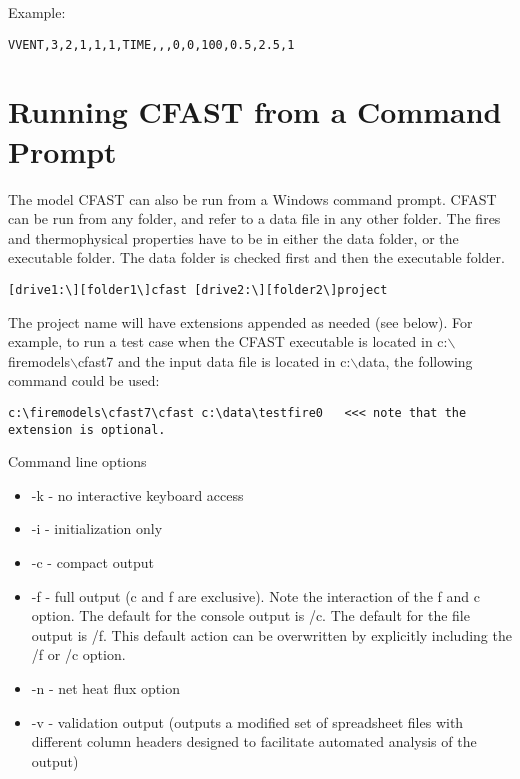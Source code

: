 \noindent Example:

\begin{lstlisting}
VVENT,3,2,1,1,1,TIME,,,0,0,100,0.5,2.5,1
\end{lstlisting}



\chapter{Running CFAST from a Command Prompt}

The model CFAST can also be run from a Windows command prompt.  CFAST can be run from any folder, and refer to a data file in any other folder. The fires and thermophysical properties have to be in either the data folder, or the executable folder. The data folder is checked first and then the executable folder.

\begin{lstlisting}
[drive1:\][folder1\]cfast [drive2:\][folder2\]project
\end{lstlisting}

The project name will have extensions appended as needed (see below). For example, to run a test case when the CFAST executable is located in c:$\backslash$firemodels$\backslash$cfast7 and the input data file is located in c:$\backslash$data, the following command could be used:

\begin{lstlisting}
c:\firemodels\cfast7\cfast c:\data\testfire0   <<< note that the extension is optional.
\end{lstlisting}

Command line options

\begin{itemize}
\item -k - no interactive keyboard access
\item -i - initialization only
\item -c - compact output
\item -f - full output (c and f are exclusive). Note the interaction of the f and c option. The default for the console output is /c. The default for the file output is /f. This default action can be overwritten by explicitly including the /f or /c option.
\item -n - net heat flux option
\item -v - validation output (outputs a modified set of spreadsheet files with different column headers designed to facilitate automated analysis of the output)
\end{itemize}


\label{last_page}
